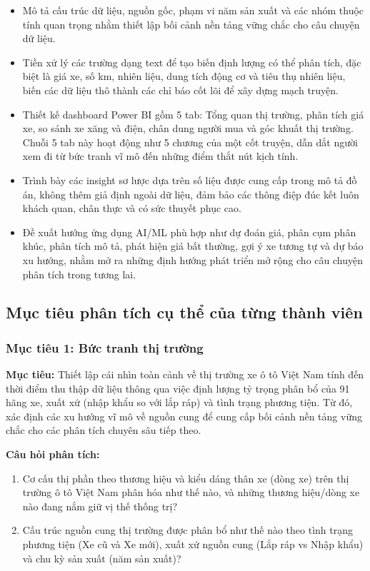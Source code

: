 \begin{itemize}
    \item Mô tả cấu trúc dữ liệu, nguồn gốc, phạm vi năm sản xuất và các nhóm thuộc tính quan trọng nhằm thiết lập bối cảnh nền tảng vững chắc cho câu chuyện dữ liệu.
    \item Tiền xử lý các trường dạng text để tạo biến định lượng có thể phân tích, đặc biệt là giá xe, số km, nhiên liệu, dung tích động cơ và tiêu thụ nhiên liệu, biến các dữ liệu thô thành các chỉ báo cốt lõi để xây dựng mạch truyện.
    \item Thiết kế dashboard Power BI gồm 5 tab: Tổng quan thị trường, phân tích giá xe, so sánh xe xăng và điện, chân dung người mua và góc khuất thị trường. Chuỗi 5 tab này hoạt động như 5 chương của một cốt truyện, dẫn dắt người xem đi từ bức tranh vĩ mô đến những điểm thắt nút kịch tính.
    \item Trình bày các insight sơ lược dựa trên số liệu được cung cấp trong mô tả đồ án, không thêm giả định ngoài dữ liệu, đảm bảo các thông điệp đúc kết luôn khách quan, chân thực và có sức thuyết phục cao.
    \item Đề xuất hướng ứng dụng AI/ML phù hợp như dự đoán giá, phân cụm phân khúc, phân tích mô tả, phát hiện giá bất thường, gợi ý xe tương tự và dự báo xu hướng, nhằm mở ra những định hướng phát triển mở rộng cho câu chuyện phân tích trong tương lai.
\end{itemize}


\subsection{Mục tiêu phân tích cụ thể của từng thành viên}

\subsubsection{Mục tiêu 1: Bức tranh thị trường}
 
\noindent\textbf{Mục tiêu:} Thiết lập cái nhìn toàn cảnh về thị trường xe ô tô Việt Nam tính đến thời điểm thu thập dữ liệu thông qua việc định lượng tỷ trọng phân bổ của 91 hãng xe, xuất xứ (nhập khẩu so với lắp ráp) và tình trạng phương tiện. Từ đó, xác định các xu hướng vĩ mô về nguồn cung để cung cấp bối cảnh nền tảng vững chắc cho các phân tích chuyên sâu tiếp theo.

\noindent\textbf{Câu hỏi phân tích:}
\begin{enumerate}
  \item Cơ cấu thị phần theo thương hiệu và kiểu dáng thân xe (dòng xe) trên thị trường ô tô Việt Nam phân hóa như thế nào, và những thương hiệu/dòng xe nào đang nắm giữ vị thế thống trị?
  \item Cấu trúc nguồn cung thị trường được phân bổ như thế nào theo tình trạng phương tiện (Xe cũ và Xe mới), xuất xứ nguồn cung (Lắp ráp vs Nhập khẩu) và chu kỳ sản xuất (năm sản xuất)?
\end{enumerate}

